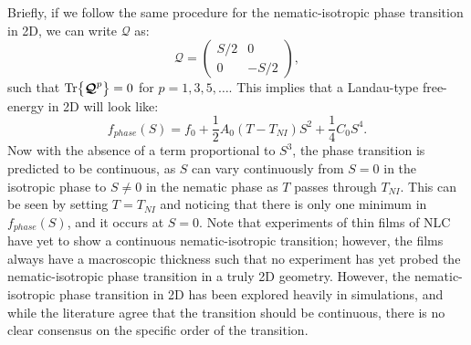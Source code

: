 Briefly, if we follow the same procedure for the nematic-isotropic phase transition in 2D, we can write $\bm{\mathcal{Q}}$ as:
\begin{equation}
  \bm{\mathcal{Q}} =
  \begin{pmatrix}
    S/2 & 0 \\
    0 & -S/2
  \end{pmatrix},
\end{equation}
such that $\textup{Tr} \big \{ \bm{\mathcal{Q}}^p \big \} = 0$ for $p = 1,3,5,\dots$.
This implies that a Landau-type free-energy in 2D will look like:
\begin{equation}
  f_{phase}(S) = f_0 + \frac{1}{2}A_0(T-T_{NI}) S^2 + \frac{1}{4}C_0 S^4.
\end{equation}
Now with the absence of a term proportional to $S^3$, the phase transition is predicted to be continuous, as $S$ can vary continuously from $S=0$ in the isotropic phase to $S \neq 0$ in the nematic phase as $T$ passes through $T_{NI}$.
This can be seen by setting $T = T_{NI}$ and noticing that there is only one minimum in $f_{phase}(S)$, and it occurs at $S=0$.
Note that experiments of thin films of NLC have yet to show a continuous nematic-isotropic transition; however, the films always have a macroscopic thickness such that no experiment has yet probed the nematic-isotropic phase transition in a truly 2D geometry.
However, the nematic-isotropic phase transition in 2D has been explored heavily in simulations, and while the literature agree that the transition should be continuous, there is no clear consensus on the specific order of the transition.


